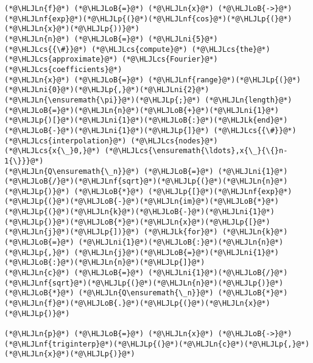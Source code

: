 \documentclass[12pt,a4paper]{article}
\newcommand{\HLJLk}[1]{\textcolor[RGB]{148,91,176}{\textbf{#1}}}
\newcommand{\HLJLn}[1]{#1}
\newcommand{\HLJLnf}[1]{\textcolor[RGB]{66,102,213}{#1}}
\newcommand{\HLJLni}[1]{\textcolor[RGB]{59,151,46}{#1}}
\newcommand{\HLJLoB}[1]{\textcolor[RGB]{102,102,102}{\textbf{#1}}}
\newcommand{\HLJLp}[1]{#1}
\newcommand{\HLJLcs}[1]{\textcolor[RGB]{153,153,119}{\textit{#1}}}
\begin{document}
\begin{lstlisting}
(*@\HLJLn{f}@*) (*@\HLJLoB{=}@*) (*@\HLJLn{x}@*) (*@\HLJLoB{->}@*) (*@\HLJLnf{exp}@*)(*@\HLJLp{(}@*)(*@\HLJLnf{cos}@*)(*@\HLJLp{(}@*)(*@\HLJLn{x}@*)(*@\HLJLp{))}@*)
(*@\HLJLn{n}@*) (*@\HLJLoB{=}@*) (*@\HLJLni{5}@*)
(*@\HLJLcs{{\#}}@*) (*@\HLJLcs{compute}@*) (*@\HLJLcs{the}@*) (*@\HLJLcs{approximate}@*) (*@\HLJLcs{Fourier}@*) (*@\HLJLcs{coefficients}@*)
(*@\HLJLn{x}@*) (*@\HLJLoB{=}@*) (*@\HLJLnf{range}@*)(*@\HLJLp{(}@*)(*@\HLJLni{0}@*)(*@\HLJLp{,}@*)(*@\HLJLni{2}@*)(*@\HLJLn{\ensuremath{\pi}}@*)(*@\HLJLp{;}@*) (*@\HLJLn{length}@*)(*@\HLJLoB{=}@*)(*@\HLJLn{n}@*)(*@\HLJLoB{+}@*)(*@\HLJLni{1}@*)(*@\HLJLp{)[}@*)(*@\HLJLni{1}@*)(*@\HLJLoB{:}@*)(*@\HLJLk{end}@*)(*@\HLJLoB{-}@*)(*@\HLJLni{1}@*)(*@\HLJLp{]}@*) (*@\HLJLcs{{\#}}@*) (*@\HLJLcs{interpolation}@*) (*@\HLJLcs{nodes}@*) (*@\HLJLcs{x{\_}0,}@*) (*@\HLJLcs{\ensuremath{\ldots},x{\_}{\{}n-1{\}}}@*)
(*@\HLJLn{Q\ensuremath{\_n}}@*) (*@\HLJLoB{=}@*) (*@\HLJLni{1}@*)(*@\HLJLoB{/}@*)(*@\HLJLnf{sqrt}@*)(*@\HLJLp{(}@*)(*@\HLJLn{n}@*)(*@\HLJLp{)}@*) (*@\HLJLoB{*}@*) (*@\HLJLp{[}@*)(*@\HLJLnf{exp}@*)(*@\HLJLp{(}@*)(*@\HLJLoB{-}@*)(*@\HLJLn{im}@*)(*@\HLJLoB{*}@*)(*@\HLJLp{(}@*)(*@\HLJLn{k}@*)(*@\HLJLoB{-}@*)(*@\HLJLni{1}@*)(*@\HLJLp{)}@*)(*@\HLJLoB{*}@*)(*@\HLJLn{x}@*)(*@\HLJLp{[}@*)(*@\HLJLn{j}@*)(*@\HLJLp{])}@*) (*@\HLJLk{for}@*) (*@\HLJLn{k}@*) (*@\HLJLoB{=}@*) (*@\HLJLni{1}@*)(*@\HLJLoB{:}@*)(*@\HLJLn{n}@*)(*@\HLJLp{,}@*) (*@\HLJLn{j}@*)(*@\HLJLoB{=}@*)(*@\HLJLni{1}@*)(*@\HLJLoB{:}@*)(*@\HLJLn{n}@*)(*@\HLJLp{]}@*)
(*@\HLJLn{c}@*) (*@\HLJLoB{=}@*) (*@\HLJLni{1}@*)(*@\HLJLoB{/}@*)(*@\HLJLnf{sqrt}@*)(*@\HLJLp{(}@*)(*@\HLJLn{n}@*)(*@\HLJLp{)}@*) (*@\HLJLoB{*}@*) (*@\HLJLn{Q\ensuremath{\_n}}@*) (*@\HLJLoB{*}@*) (*@\HLJLn{f}@*)(*@\HLJLoB{.}@*)(*@\HLJLp{(}@*)(*@\HLJLn{x}@*)(*@\HLJLp{)}@*)

(*@\HLJLn{p}@*) (*@\HLJLoB{=}@*) (*@\HLJLn{x}@*) (*@\HLJLoB{->}@*) (*@\HLJLnf{triginterp}@*)(*@\HLJLp{(}@*)(*@\HLJLn{c}@*)(*@\HLJLp{,}@*) (*@\HLJLn{x}@*)(*@\HLJLp{)}@*)


\end{lstlisting}
\end{document}
